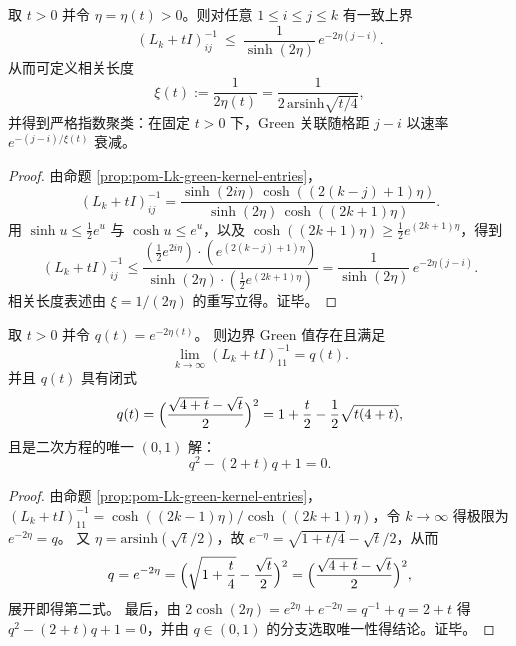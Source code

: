\begin{corollary}\label{cor:pom-Lk-exponential-clustering-gaplaw}
取 \(t>0\) 并令 \(\eta=\eta(t)>0\)。则对任意 \(1\le i\le j\le k\) 有一致上界
\[
(L_k+tI)^{-1}_{ij}\ \le\ \frac{1}{\sinh(2\eta)}\,e^{-2\eta(j-i)}.
\]
从而可定义相关长度
\[
\xi(t):=\frac{1}{2\eta(t)}=\frac{1}{2\,\mathrm{arsinh}\sqrt{t/4}},
\]
并得到严格指数聚类：在固定 \(t>0\) 下，Green 关联随格距 \(j-i\) 以速率 \(e^{-(j-i)/\xi(t)}\) 衰减。
\end{corollary}
\begin{proof}
由命题 \ref{prop:pom-Lk-green-kernel-entries}，
\[
(L_k+tI)^{-1}_{ij}
=\frac{\sinh(2i\eta)\,\cosh((2(k-j)+1)\eta)}{\sinh(2\eta)\,\cosh((2k+1)\eta)}.
\]
用 \(\sinh u\le \tfrac12 e^{u}\) 与 \(\cosh u\le e^{u}\)，以及 \(\cosh((2k+1)\eta)\ge \tfrac12 e^{(2k+1)\eta}\)，得到
\[
(L_k+tI)^{-1}_{ij}
\le
\frac{(\tfrac12 e^{2i\eta})\cdot (e^{(2(k-j)+1)\eta})}{\sinh(2\eta)\cdot (\tfrac12 e^{(2k+1)\eta})}
=\frac{1}{\sinh(2\eta)}\,e^{-2\eta(j-i)}.
\]
相关长度表述由 \(\xi=1/(2\eta)\) 的重写立得。证毕。
\end{proof}

\begin{corollary}\label{cor:pom-Lk-boundary-fixed-point-riccati}
取 \(t>0\) 并令 \(q(t)=e^{-2\eta(t)}\)。
则边界 Green 值存在且满足
\[
\lim_{k\to\infty}(L_k+tI)^{-1}_{11}=q(t).
\]
并且 \(q(t)\) 具有闭式
\[
q(t)=\Bigl(\frac{\sqrt{4+t}-\sqrt{t}}{2}\Bigr)^{2}
=1+\frac{t}{2}-\frac{1}{2}\sqrt{t(4+t)},
\]
且是二次方程的唯一 \((0,1)\) 解：
\[
q^2-(2+t)q+1=0.
\]
\end{corollary}
\begin{proof}
由命题 \ref{prop:pom-Lk-green-kernel-entries}，\((L_k+tI)^{-1}_{11}=\cosh((2k-1)\eta)/\cosh((2k+1)\eta)\)，令 \(k\to\infty\) 得极限为 \(e^{-2\eta}=q\)。
又 \(\eta=\mathrm{arsinh}(\sqrt{t}/2)\)，故 \(e^{-\eta}=\sqrt{1+t/4}-\sqrt{t}/2\)，从而
\[
q=e^{-2\eta}=\Bigl(\sqrt{1+\frac{t}{4}}-\frac{\sqrt{t}}{2}\Bigr)^2
=\Bigl(\frac{\sqrt{4+t}-\sqrt{t}}{2}\Bigr)^2,
\]
展开即得第二式。
最后，由 \(2\cosh(2\eta)=e^{2\eta}+e^{-2\eta}=q^{-1}+q=2+t\) 得 \(q^2-(2+t)q+1=0\)，并由 \(q\in(0,1)\) 的分支选取唯一性得结论。证毕。
\end{proof}

